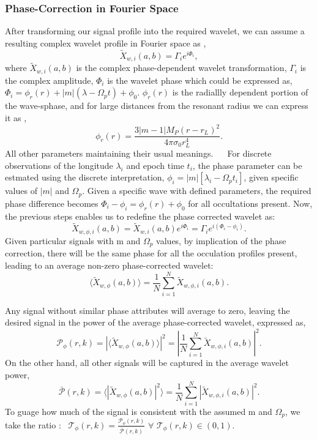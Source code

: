 \documentclass[conference]{IEEEtran}
\begin{document}
\subsubsection{Phase-Correction in Fourier Space}
After transforming our signal profile into the required wavelet, we can assume a resulting complex wavelet profile in Fourier space as \cite{Hedman_2018}, \begin{equation}    \tilde{X}_{w,i}(a,b) = \Gamma_{i}e^{i\Phi_{i}},\end{equation}where $\tilde{X}_{w,i}(a,b)$ is the complex phase-dependent wavelet transformation, $\Gamma_{i}$ is the complex amplitude, $\Phi_{i}$ is the wavelet phase which could be expressed as, $\Phi_{i} = \phi_{r}(r) + |m|(\lambda - \Omega_{p}t) + \phi_{0}$. $\phi_{r}(r)$ is the radiallly dependent portion of the wave-sphase, and for large distances from the resonant radius we can express it as \cite{1984prin.conf..513S},\begin{equation}    \phi_{r}(r) = \frac{3|m-1|M_{P}(r - r_{L})^{2}}{4\pi\sigma_{0}r^{4}_{L}}.\end{equation}All other parameters maintaining their usual meanings.   
For discrete observations of the longitude $\lambda_{i}$ and epoch time $t_{i}$, the phase parameter can be estmated using the discrete interpretation, $\phi_{i} = |m|[\lambda_{i} - \Omega_{p}t_{i}]$, given specific values of $|m|$ and $\Omega_{p}$. Given a specific wave with defined parameters, the required phase difference becomes $\Phi_{i} - \phi_{i} = \phi_{r}(r) + \phi_{0}$ for all occultations present. Now, the previous steps enables us to redefine the phase corrected wavelet as:\begin{equation}    \tilde{X}_{w,\phi,i}(a,b) = \tilde{X}_{w,i}(a,b)e^{i\Phi_{i}} = \Gamma_{i}e^{i(\Phi_{i} - \phi_{i})}.\end{equation}
Given particular signals with m and $\Omega_{p}$ values, by implication of the phase correction, there will be the same phase for all the occulation profiles present, leading to an average non-zero phase-corrected wavelet:\begin{equation}    \langle\tilde{X}_{w,\phi}(a,b)\rangle = \frac{1}{N} \sum_{i=1}^{N}\tilde{X}_{w,\phi,i}(a,b).\end{equation}


Any signal without similar phase attributes will average to zero, leaving the desired signal in the power of the average phase-corrected wavelet, expressed as,\begin{equation}    \mathcal{P}_{\phi}(r,k) = |\langle\tilde{X}_{w,\phi}(a,b)\rangle|^{2} = \left|\frac{1}{N} \sum_{i=1}^{N}\tilde{X}_{w,\phi,i}(a,b)\right|^{2}.\end{equation}On the other hand, all other signals will be captured in the average wavelet power,\begin{equation}     \bar{\mathcal{P}}(r,k) = \langle|\tilde{X}_{w,\phi}(a,b)|^{2}\rangle = \frac{1}{N} \sum_{i=1}^{N}|\tilde{X}_{w,\phi,i}(a,b)|^{2}.\end{equation}
To guage how much of the signal is consistent with the assumed m and $\Omega_{p}$, we take the ratio \cite{Hedman_2013}:  $\mathcal{T}_{\phi}(r,k) = \frac{\mathcal{P}_{\phi}(r,k)}{\bar{\mathcal{P}}(r,k)}$ $\forall$ $\mathcal{T}_{\phi}(r,k) \in (0,1)$.
\end{document}
